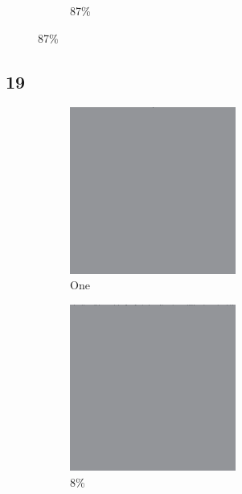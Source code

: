 \documentclass[12pt, fleqn]{report}                             %
\theoremstyle{break}                                            %
\begin{document}
\begin{figure}[ht!]
\begin{subfigure}[b]{0.4\linewidth}
          \caption{87\%}
        \end{subfigure}
      \end{figure}


      \clearpage
      \subsection{19}
      \begin{figure}[ht!]
        \centering
        \begin{subfigure}[b]{0.4\linewidth}
          \includegraphics[width=0.6\textwidth]{Images/19/a.png}
          \caption{One}
        \end{subfigure}
        \begin{subfigure}[b]{0.4\linewidth}
          \includegraphics[width=0.6\textwidth]{Images/19/b.png}
          \caption{8\%}
        \end{subfigure}
        \begin{subfigure}[b]{0.4\linewidth}

\end{subfigure}
\end{figure}
\end{document}
